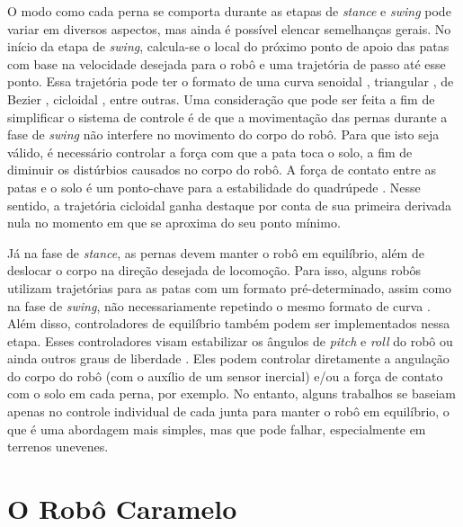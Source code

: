 \documentclass[conference]{IEEEtran}
\begin{document}
O modo como cada perna se comporta durante as etapas de \textit{stance} e \textit{swing} pode variar em diversos aspectos, mas ainda é possível elencar semelhanças gerais. No início da etapa de \textit{swing}, calcula-se o local do próximo ponto de apoio das patas com base na velocidade desejada para o robô e uma trajetória de passo até esse ponto. Essa trajetória pode ter o formato de uma curva senoidal \cite{X.118}, triangular \cite{StanfordPupper}, de Bezier \cite{HackadayQuadruped}, cicloidal \cite{Shi2021} \cite{X.58}, entre outras. Uma consideração que pode ser feita a fim de simplificar o sistema de controle é de que a movimentação das pernas durante a fase de \textit{swing} não interfere no movimento do corpo do robô. Para que isto seja válido, é necessário controlar a força com que a pata toca o solo, a fim de diminuir os distúrbios causados no corpo do robô. A força de contato entre as patas e o solo é um ponto-chave para a estabilidade do quadrúpede \cite{X.118}. Nesse sentido, a trajetória cicloidal ganha destaque por conta de sua primeira derivada nula no momento em que se aproxima do seu ponto mínimo.

Já na fase de \textit{stance}, as pernas devem manter o robô em equilíbrio, além de deslocar o corpo na direção desejada de locomoção. Para isso, alguns robôs utilizam trajetórias para as patas com um formato pré-determinado, assim como na fase de \textit{swing}, não necessariamente repetindo o mesmo formato de curva \cite{X.118, X.58}. Além disso, controladores de equilíbrio também podem ser implementados nessa etapa. Esses controladores visam estabilizar os ângulos de \textit{pitch} e \textit{roll} do robô \cite{Shi2021, StanfordPupper, HackadayQuadruped, Notspot} ou ainda outros graus de liberdade \cite{X.134, Chen2020140736, Zhang2016284}. Eles podem controlar diretamente a angulação do corpo do robô (com o auxílio de um sensor inercial) e/ou a força de contato com o solo em cada perna, por exemplo. No entanto, alguns trabalhos se baseiam apenas no controle individual de cada junta para manter o robô em equilíbrio, o que é uma abordagem mais simples, mas que pode falhar, especialmente em terrenos unevenes.

\section{O Robô Caramelo}
\end{document}
